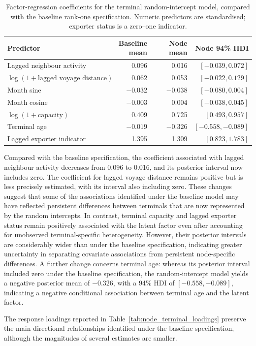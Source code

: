 \documentclass[pdftex,12pt,openright,a4paper,oneside]{book}
\begin{document}
\begin{table}[htbp]
\centering
\caption{Factor-regression coefficients for the
terminal random-intercept model, compared with
the baseline rank-one specification.
Numeric predictors are standardised;
exporter status is a zero--one indicator.}
\label{tab:node_terminal_beta}
\small
\begin{tabular}{lrrr}
\hline
Predictor & Baseline mean & Node mean & Node 94\% HDI \\
\hline
Lagged neighbour activity
& 0.096 & 0.016 & $[-0.039,0.072]$ \\
$\log(1+\text{lagged voyage distance})$
& 0.062 & 0.053 & $[-0.022,0.129]$ \\
Month sine
& $-0.032$ & $-0.038$ & $[-0.080,0.004]$ \\
Month cosine
& $-0.003$ & 0.004 & $[-0.038,0.045]$ \\
$\log(1+\text{capacity})$
& 0.409 & 0.725 & $[0.493,0.957]$ \\
Terminal age
& $-0.019$ & $-0.326$ & $[-0.558,-0.089]$ \\
Lagged exporter indicator
& 1.395 & 1.309 & $[0.823,1.783]$ \\
\hline
\end{tabular}
\end{table}
Compared with the baseline specification,
the coefficient associated with lagged
neighbour activity decreases from 0.096
to 0.016, and its posterior interval
now includes zero. The coefficient for
lagged voyage distance remains positive
but is less precisely estimated, with
its interval also including zero.
These changes suggest that some of the
associations identified under the baseline
model may have reflected persistent
differences between terminals that are
now represented by the random intercepts.
In contrast, terminal capacity and lagged exporter
status remain positively associated with the latent
factor even after accounting for unobserved
terminal-specific heterogeneity.
However, their posterior intervals
are considerably wider than under
the baseline specification, indicating
greater uncertainty in separating
covariate associations from persistent
node-specific differences.
A further change concerns terminal age:
whereas its posterior interval included
zero under the baseline specification,
the random-intercept model yields a
negative posterior mean of $-0.326$,
with a 94\% HDI of $[-0.558,-0.089]$,
indicating a negative conditional
association between terminal age and
the latent factor.

The response loadings reported in Table~\ref{tab:node_terminal_loadings} 
preserve the main directional relationships identified
under the baseline specification, although the magnitudes of several estimates
are smaller.
\end{document}
